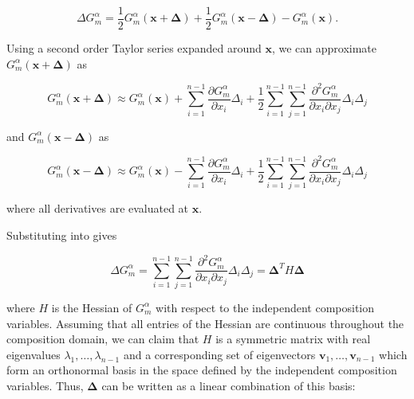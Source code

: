 \begin{equation}\label{eq:energy_change}
\Delta G^\alpha_m = \frac{1}{2}G^\alpha_m(\boldsymbol{x}+\boldsymbol{\Delta}) + \frac{1}{2}G^\alpha_m(\boldsymbol{x}-\boldsymbol{\Delta}) -G^\alpha_m(\boldsymbol{x}).
\end{equation}

\noindent Using a second order Taylor series expanded around $\boldsymbol{x}$, we can approximate $G^\alpha_m(\boldsymbol{x}+\boldsymbol{\Delta})$ as 

\begin{equation}\label{eq:Taylor_1}
    G^\alpha_m(\boldsymbol{x}+\boldsymbol{\Delta})\approx G^\alpha_m(\boldsymbol{x}) + \sum_{i=1}^{n-1}\frac{\partial G^\alpha_m}{\partial x_i}\Delta_i+\frac{1}{2}\sum_{i=1}^{n-1}\sum_{j=1}^{n-1}\frac{\partial^2G^\alpha_m}{\partial x_i\partial x_j}\Delta_i\Delta_j
\end{equation}

\noindent and $G^\alpha_m(\boldsymbol{x}-\boldsymbol{\Delta})$ as

\begin{equation} \label{eq:Taylor_2}
    G^\alpha_m(\boldsymbol{x}-\boldsymbol{\Delta})\approx G^\alpha_m(\boldsymbol{x}) - \sum_{i=1}^{n-1}\frac{\partial G^\alpha_m}{\partial x_i}\Delta_i+\frac{1}{2}\sum_{i=1}^{n-1}\sum_{j=1}^{n-1}\frac{\partial^2G^\alpha_m}{\partial x_i\partial x_j}\Delta_i\Delta_j
\end{equation}

\noindent where all derivatives are evaluated at $\boldsymbol{x}$.

Substituting  into  gives

\begin{equation} \label{eq:Hessian}
\Delta G^\alpha_m = \sum_{i=1}^{n-1}\sum_{j=1}^{n-1}\frac{\partial^2G^\alpha_m}{\partial x_i\partial x_j}\Delta_i\Delta_j=\boldsymbol{\Delta}^TH\boldsymbol{\Delta}
\end{equation}

\noindent where $H$ is the Hessian of $G^\alpha_m$ with respect to the independent composition variables. Assuming that all entries of the Hessian are continuous throughout the composition domain, we can claim that $H$ is a symmetric matrix with real eigenvalues $\lambda_1,\hdots,\lambda_{n-1}$ and a corresponding set of eigenvectors $\boldsymbol{v}_1,\hdots,\boldsymbol{v}_{n-1}$ which form an orthonormal basis in the space defined by the independent composition variables. Thus, $\boldsymbol{\Delta}$ can be written as a linear combination of this basis:

